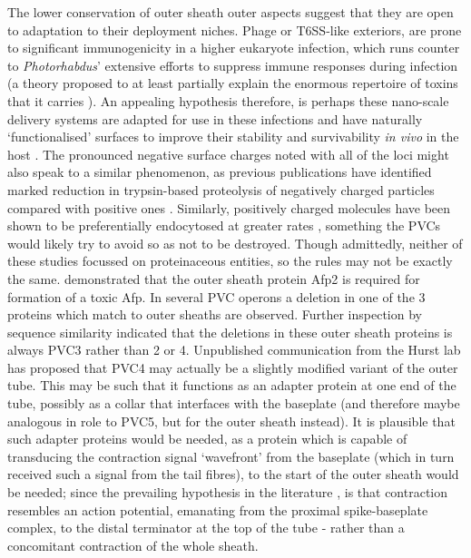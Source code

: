 The lower conservation of outer sheath outer aspects suggest that they are open to adaptation to their deployment niches. Phage or T6SS-like exteriors, are prone to significant immunogenicity in a higher eukaryote infection, which runs counter to \emph{Photorhabdus}' extensive efforts to suppress immune responses during infection (a theory proposed to at least partially explain the enormous repertoire of toxins that it carries \citep{Eleftherianos2010}). An appealing hypothesis therefore, is perhaps these nano-scale delivery systems are adapted for use in these infections and have naturally `functionalised' surfaces to improve their stability and survivability \emph{in vivo} in the host \citep{DelTordello2016, Kaur2012}. The pronounced negative surface charges noted with all of the loci might also speak to a similar phenomenon, as previous publications have identified marked reduction in trypsin-based proteolysis of negatively charged particles compared with positive ones \citep{Liu1992}. Similarly, positively charged molecules have been shown to be preferentially endocytosed at greater rates \citep{Chung2007}, something the PVCs would likely try to avoid so as not to be destroyed. Though admittedly, neither of these studies focussed on proteinaceous entities, so the rules may not be exactly the same. \cite{Hurst2004} demonstrated that the outer sheath protein Afp2 is required for formation of a toxic Afp. In several PVC operons a deletion in one of the 3 proteins which match to outer sheaths are observed. Further inspection by sequence similarity indicated that the deletions in these outer sheath proteins is always PVC3 rather than 2 or 4. Unpublished communication from the Hurst lab has proposed that PVC4 may actually be a slightly modified variant of the outer tube. This may be such that it functions as an adapter protein at one end of the tube, possibly as a collar that interfaces with the baseplate (and therefore maybe analogous in role to PVC5, but for the outer sheath instead). It is plausible that such adapter proteins would be needed, as a protein which is capable of transducing the contraction signal `wavefront' from the baseplate (which in turn received such a signal from the tail fibres), to the start of the outer sheath would be needed; since the prevailing hypothesis in the literature \cite{Kube2015}, is that contraction resembles an action potential, emanating from the proximal spike-baseplate complex, to the distal terminator at the top of the tube -  rather than a concomitant contraction of the whole sheath.

